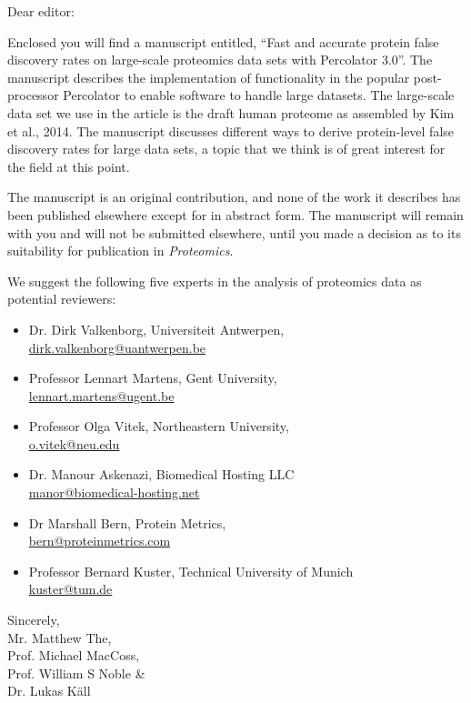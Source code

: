 \documentclass[a4paper]{letter}
\begin{document}
\begin{letter}{}
\vspace*{-5.0cm}

\opening{Dear editor:}

Enclosed you will find a manuscript entitled, ``Fast and accurate
protein false discovery rates on large-scale proteomics data sets with
Percolator 3.0''. The manuscript describes the implementation of
functionality in the popular post-processor Percolator to enable
software to handle large datasets. The large-scale data set we use in
the article is the draft human proteome as assembled by Kim et al.,
2014. The manuscript discusses different ways to derive protein-level
false discovery rates for large data sets, a topic that we think is of
great interest for the field at this point.

The manuscript is an original contribution, and none of the work it
describes has been published elsewhere except for in abstract
form. The manuscript will remain with you and will not be submitted
elsewhere, until you made a decision as to its suitability for
publication in {\em Proteomics}.

We suggest the following five experts in the analysis of proteomics
data as potential reviewers:

\begin{itemize}

\item Dr. Dirk Valkenborg, Universiteit Antwerpen,\\
\url{dirk.valkenborg@uantwerpen.be}

\item Professor Lennart Martens,
Gent University, \\
\url{lennart.martens@ugent.be}

\item Professor Olga Vitek,
      Northeastern University, \\
\url{o.vitek@neu.edu}

\item Dr. Manour Askenazi, Biomedical Hosting LLC\\
\url{manor@biomedical-hosting.net}

\item Dr Marshall Bern, Protein Metrics, \\
\url{bern@proteinmetrics.com}

\item Professor Bernard Kuster, Technical University of Munich\\
\url{kuster@tum.de}

\end{itemize}

\vspace*{1.5em}

Sincerely,\\[2em]
Mr. Matthew The,\\
Prof. Michael MacCoss,\\
Prof. William S Noble \& \\
Dr. Lukas K\"all

\end{letter}
\end{document}
